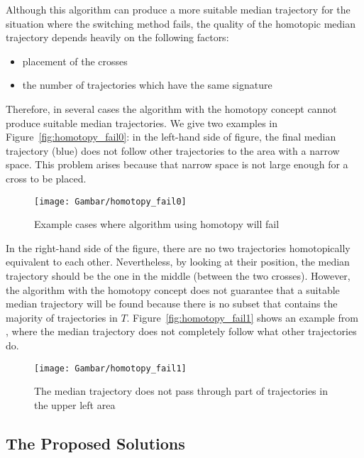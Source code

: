 Although this algorithm can produce a more suitable median trajectory for the situation where the switching method fails, the quality of the homotopic median trajectory depends heavily on the following factors:
\begin{itemize}
\item placement of the crosses
\item the number of trajectories which have the same signature 
\end{itemize}

Therefore, in several cases the algorithm with the homotopy concept cannot produce suitable median trajectories.
We give two examples in Figure~\ref{fig:homotopy_fail0}: in the left-hand side of figure, the final median trajectory (blue) does not follow other trajectories to the area with a narrow space. 
This problem arises because that narrow space is not large enough for a cross to be placed. 

\begin{figure}
\centering
\texttt{[image: Gambar/homotopy\_fail0]}
\caption[Example cases where algorithm using homotopy will fail]{Example cases where algorithm using homotopy will fail} 
\end{figure}

In the right-hand side of the figure, there are no two trajectories homotopically equivalent to each other. 
Nevertheless, by looking at their position, the median trajectory should be the one in the middle (between the two crosses).
However, the algorithm with the homotopy concept does not guarantee that a suitable median trajectory will be found because there is no subset that contains the majority of trajectories in $T$. 
Figure~\ref{fig:homotopy_fail1} shows an example from \cite{Lionov:2009}, where the median trajectory does not completely follow what other trajectories do.

\begin{figure}
\centering
\texttt{[image: Gambar/homotopy\_fail1]}
\caption{The median trajectory does not pass through part of trajectories in the upper left area}
\end{figure}

\subsection{The Proposed Solutions}

